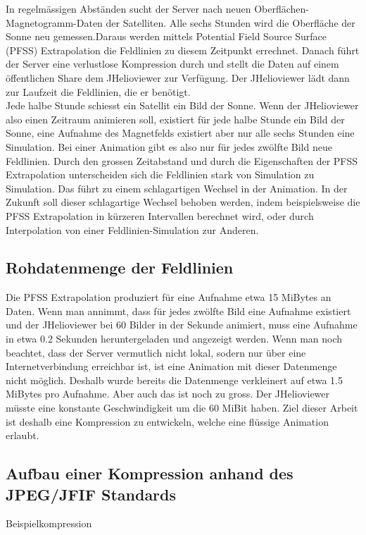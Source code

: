 In regelmässigen Abständen sucht der Server nach neuen Oberflächen-Magnetogramm-Daten der Satelliten. Alle sechs Stunden wird die Oberfläche der Sonne neu gemessen.Daraus werden mittels Potential Field Source Surface (PFSS) Extrapolation die Feldlinien zu diesem Zeitpunkt errechnet. Danach führt der Server eine verlustlose Kompression durch und stellt die Daten auf einem öffentlichen Share dem JHelioviewer zur Verfügung. Der JHelioviewer lädt dann zur Laufzeit die Feldlinien, die er benötigt.\\[\baselineskip]
Jede halbe Stunde schiesst ein Satellit ein Bild der Sonne. Wenn der JHelioviewer also einen Zeitraum animieren soll, existiert für jede halbe Stunde ein Bild der Sonne, eine Aufnahme des Magnetfelds existiert aber nur alle sechs Stunden eine Simulation. Bei einer Animation gibt es also nur für jedes zwölfte Bild neue Feldlinien. Durch den grossen Zeitabstand und durch die Eigenschaften der PFSS Extrapolation unterscheiden sich die Feldlinien stark von Simulation zu Simulation. Das führt zu einem schlagartigen Wechsel in der Animation. In der Zukunft soll dieser schlagartige Wechsel behoben werden, indem beispielsweise die PFSS Extrapolation in kürzeren Intervallen berechnet wird, oder durch Interpolation von einer Feldlinien-Simulation zur Anderen.

\subsection{Rohdatenmenge der Feldlinien}
Die PFSS Extrapolation produziert für eine Aufnahme etwa 15 MiBytes an Daten. Wenn man annimmt, dass für jedes zwölfte Bild eine Aufnahme existiert und der JHelioviewer bei 60 Bilder in der Sekunde animiert, muss eine Aufnahme in etwa 0.2 Sekunden heruntergeladen und angezeigt werden. Wenn man noch beachtet, dass der Server vermutlich nicht lokal, sodern nur über eine Internetverbindung erreichbar ist, ist eine Animation mit dieser Datenmenge nicht möglich. Deshalb wurde bereits die Datenmenge verkleinert auf etwa 1.5 MiBytes pro Aufnahme. Aber auch das ist noch zu gross. Der JHelioviewer müsste eine konstante Geschwindigkeit um die 60 MiBit haben. Ziel dieser Arbeit ist deshalb eine Kompression zu entwickeln, welche eine flüssige Animation erlaubt.

\subsection{Aufbau einer Kompression anhand des JPEG/JFIF Standards}
Beispielkompression




 